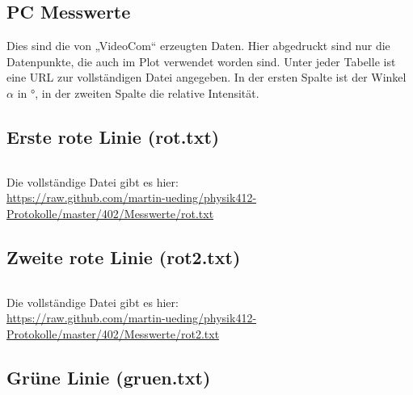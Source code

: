\FloatBarrier
\begin{appendix}
    \section{PC Messwerte}
    \label{sec:pc_messwerte}

    Dies sind die von „VideoCom“ erzeugten Daten. Hier abgedruckt sind nur die
    Datenpunkte, die auch im Plot verwendet worden sind. Unter jeder Tabelle
    ist eine URL zur vollständigen Datei angegeben. In der ersten Spalte ist
    der Winkel $\alpha$ in $\si\degree$, in der zweiten Spalte die relative
    Intensität.

    \subsection{Erste rote Linie (rot.txt)}
    \begin{multicols}{5}
        \inputminted[tabsize=4, firstline=<< rot_lower >>, lastline=<< rot_upper >>, fontsize=\footnotesize]{text}{../Messwerte/rot.txt}
    \end{multicols}

    Die vollständige Datei gibt es hier: \\
    \url{https://raw.github.com/martin-ueding/physik412-Protokolle/master/402/Messwerte/rot.txt}

    \subsection{Zweite rote Linie (rot2.txt)}
    \begin{multicols}{5}
        \inputminted[tabsize=4, firstline=<< rot2_lower >>, lastline=<< rot2_upper >>, fontsize=\footnotesize]{text}{../Messwerte/rot2.txt}
    \end{multicols}

    Die vollständige Datei gibt es hier: \\
    \url{https://raw.github.com/martin-ueding/physik412-Protokolle/master/402/Messwerte/rot2.txt}

    \subsection{Grüne Linie (gruen.txt)}
    \begin{multicols}{5}
        \inputminted[tabsize=4, firstline=<< gruen_lower >>, lastline=<< gruen_upper >>, fontsize=\footnotesize]{text}{../Messwerte/gruen.txt}
    \end{multicols}


\end{appendix}
